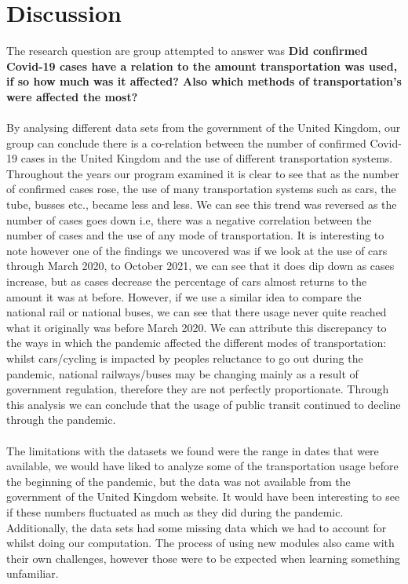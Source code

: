 \documentclass[fontsize=11pt]{article}
\begin{document}
\section*{Discussion}

The research question are group attempted to answer was \textbf{Did confirmed Covid-19 cases have a relation to the amount transportation was used, if so how much was it affected? Also which methods of transportation's were affected the most?} \\ \\

By analysing different data sets from the government of the United Kingdom, our group can conclude there is a co-relation between the number of confirmed Covid-19 cases in the United Kingdom and the use of different transportation systems. Throughout the years our program examined it is clear to see that as the number of confirmed cases rose, the use of many transportation systems such as cars, the tube, busses etc., became less and less. We can see this trend was reversed as the number of cases goes down i.e, there was a negative correlation between the number of cases and the use of any mode of transportation. It is interesting to note however one of the findings we uncovered was if we look at the use of cars through March 2020, to October 2021, we can see that it does dip down as cases increase, but as cases decrease the percentage of cars almost returns to the amount it was at before. However, if we use a similar idea to compare the national rail or national buses, we can see that there usage never quite reached what it originally was before March 2020. We can attribute this discrepancy to the ways in which the pandemic affected the different modes of transportation: whilst cars/cycling is impacted by peoples reluctance to go out during the pandemic, national railways/buses may be changing mainly as a result of government regulation, therefore they are not perfectly proportionate. Through this analysis we can conclude that the usage of public transit continued to decline through the pandemic. \\ \\

The limitations with the datasets we found were the range in dates that were available, we would have liked to analyze some of the transportation usage before the beginning of the pandemic, but the data was not available from the government of the United Kingdom website. It would have been interesting to see if these numbers fluctuated as much as they did during the pandemic. Additionally, the data sets had some missing data which we had to account for whilst doing our computation. The process of using new modules also came with their own challenges, however those were to be expected when learning something unfamiliar. \\ \\
\end{document}
